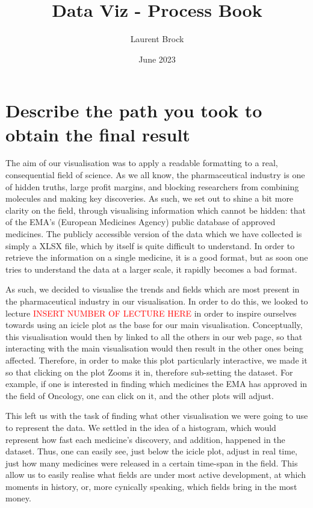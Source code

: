 \documentclass{article}
\title{Data Viz - Process Book}
\author{Laurent Brock}
\date{June 2023}
\begin{document}
\maketitle

\section{Describe the path you took to obtain the final result}

The aim of our visualisation was to apply a readable formatting to a real, consequential field of science. As we all know, the pharmaceutical industry is one of hidden truths, large profit margins, and blocking researchers from combining molecules and making key discoveries. As such, we set out to shine a bit more clarity on the field, through visualising information which cannot be hidden: that of the EMA's (European Medicines Agency) public database of approved medicines. The publicly accessible version of the data which we have collected is simply a XLSX file, which by itself is quite difficult to understand. In order to retrieve the information on a single medicine, it is a good format, but as soon one tries to understand the data at a larger scale, it rapidly becomes a bad format.

As such, we decided to visualise the trends and fields which are most present in the pharmaceutical industry in our visualisation. In order to do this, we looked to lecture \textcolor{red}{INSERT NUMBER OF LECTURE HERE} in order to inspire ourselves towards using an icicle plot as the base for our main visualisation. Conceptually, this visualisation would then by linked to all the others in our web page, so that interacting with the main visualisation would then result in the other ones being affected. Therefore, in order to make this plot particularly interactive, we made it so that clicking on the plot Zooms it in, therefore sub-setting the dataset. For example, if one is interested in finding which medicines the EMA has approved in the field of Oncology, one can click on it, and the other plots will adjust.

This left us with the task of finding what other visualisation we were going to use to represent the data. We settled in the idea of a histogram, which would represent how fast each medicine's discovery, and addition, happened in the dataset. Thus, one can easily see, just below the icicle plot, adjust in real time, just how many medicines were released in a certain time-span in the field. This allow us to easily realise what fields are under most active development, at which moments in history, or, more cynically speaking, which fields bring in the most money.
\end{document}
